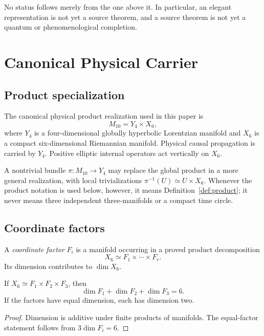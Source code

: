 \documentclass[11pt]{article}
\begin{document}
No status follows merely from the one above it.  In particular, an elegant
representation is not yet a source theorem, and a source theorem is not yet a
quantum or phenomenological completion.

\section{Canonical Physical Carrier}

\subsection{Product specialization}

\begin{definition}\label{def:product}
The canonical physical product realization used in this paper is
\[
 M_{10}=Y_4\times X_6,
\]
where $Y_4$ is a four-dimensional globally hyperbolic Lorentzian manifold and
$X_6$ is a compact six-dimensional Riemannian manifold.  Physical causal
propagation is carried by $Y_4$.  Positive elliptic internal operators act
vertically on $X_6$.
\end{definition}

A nontrivial bundle $\pi:M_{10}\to Y_4$ may replace the global product in a
more general realization, with local trivializations
$\pi^{-1}(U)\simeq U\times X_6$.  Whenever the product notation is used below,
however, it means Definition~\ref{def:product}; it never means three
independent three-manifolds or a compact time circle.

\subsection{Coordinate factors}

\begin{definition}
A \emph{coordinate factor} $F_i$ is a manifold occurring in a proved product
decomposition
\[
 X_6\simeq F_1\times\cdots\times F_r.
\]
Its dimension contributes to $\dim X_6$.
\end{definition}

\begin{proposition}\label{prop:dimension}
If $X_6\simeq F_1\times F_2\times F_3$, then
\[
 \dim F_1+\dim F_2+\dim F_3=6.
\]
If the factors have equal dimension, each has dimension two.
\end{proposition}

\begin{proof}
Dimension is additive under finite products of manifolds.  The equal-factor
statement follows from $3\dim F_i=6$.
\end{proof}
\end{document}

